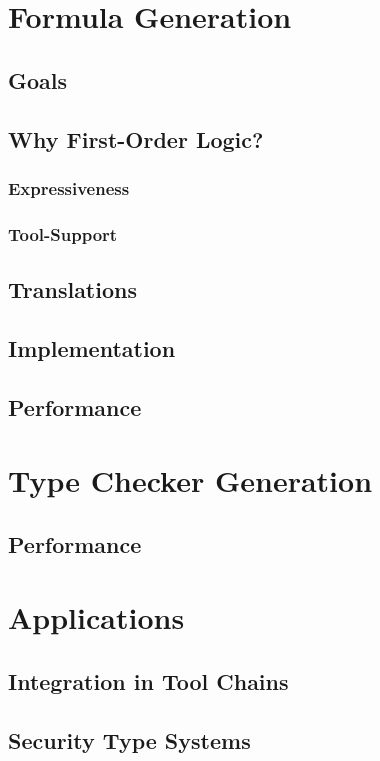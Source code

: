\documentclass[a4paper,twoside]{report}
\begin{document}
\chapter{Formula Generation}
\section{Goals}
\section{Why First-Order Logic?}
\subsection{Expressiveness}
\subsection{Tool-Support}
\section{Translations}
\section{Implementation}
\section{Performance}

\chapter{Type Checker Generation}
\section{Performance}

\chapter{Applications}
\section{Integration in Tool Chains}
\section{Security Type Systems}
\end{document}
